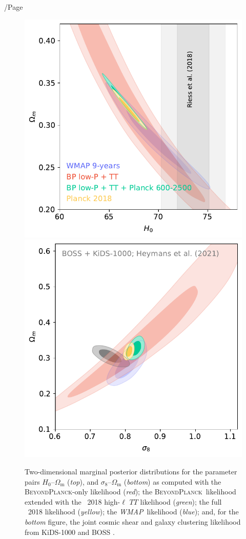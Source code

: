 /Page\documentclass[twocolumn]{aa}
\def\WMAP{\textit{WMAP}}
\newcommand{\BP}{\textsc{BeyondPlanck}}
\begin{document}
\begin{figure}[ht]
	\center
	\includegraphics[width=\linewidth]{figs/BP10_ext_H0_OmM.pdf} \\
	\includegraphics[width=\linewidth]{figs/BP10_ext_s8_OmM.pdf}
	\caption{Two-dimensional marginal posterior distributions for the parameter pairs 
	$H_0$--$\Omega_{\mathrm m}$ (\emph{top}), and $\sigma_8$--$\Omega_{\mathrm m}$ (\emph{bottom}) 
	as computed with the \BP-only likelihood (\emph{red}); the
        \BP\ likelihood extended with the \Planck\ 2018 high-$\ell$
        $TT$ likelihood (\emph{green}); the full \Planck\ 2018 likelihood 
	(\emph{yellow}); the \WMAP\ likelihood (\emph{blue}); and, for the 
	\emph{bottom} figure, the joint cosmic shear and galaxy clustering
	likelihood from KiDS-1000 and BOSS \citep[][\emph{gray}]{KiDS2021}.}
	\label{fig:s8_omb}
\end{figure}
\end{document}
